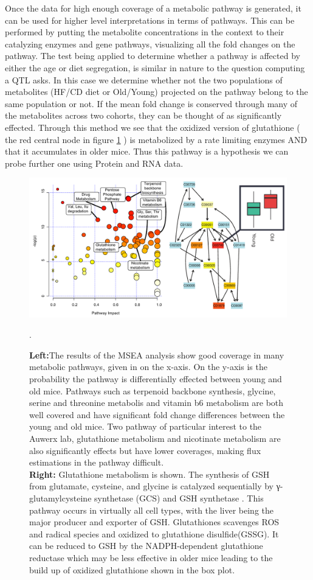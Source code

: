 \documentclass[a4paper]{book}
\begin{document}
	Once the data for high enough coverage of a metabolic pathway is generated, it can be used for higher level interpretations in terms of pathways. This can be performed by putting the metabolite concentrations in the context to their catalyzing enzymes and gene pathways, visualizing all the fold changes on the pathway. The test being applied to determine whether a pathway is affected by either the age or diet segregation, is similar in nature to the question computing a QTL asks. In this case we determine whether not the two populations of metabolites (HF/CD diet or Old/Young) projected on the pathway belong to the same population or not. If the mean fold change is conserved through many of the metabolites across two cohorts, they can be thought of as significantly effected\citep{Wishart2013}. Through this method we see that the oxidized version of glutathione ( the red central node in figure \ref{fig:MSEA} ) is metabolized by a rate limiting enzymes AND that it accumulates in older mice.  Thus this pathway is a hypothesis we can probe further one using Protein and RNA data.
	
	\begin{figure}
				\centering
		\includegraphics[width=0.99\linewidth]{3.Metabolomics/MSEA}
		\caption{\textbf{Left:}The results of the MSEA analysis show good coverage in many metabolic pathways, given in on the x-axis. On the y-axis is the probability the pathway is differentially effected between young and old mice. Pathways such as terpenoid backbone synthesis, glycine, serine and threonine metabolis and vitamin b6 metabolism are both well covered and have significant fold change differences between the young and old mice. Two pathway of particular interest to the Auwerx lab, glutathione metabolism and nicotinate metabolism are also significantly effects but have lower coverages, making flux estimations in the pathway difficult. \\ \textbf{Right:} Glutathione metabolism is shown. The synthesis of GSH from glutamate, cysteine, and glycine is catalyzed sequentially by γ-glutamylcysteine synthetase (GCS) and GSH synthetase . This pathway occurs in virtually all cell types, with the liver being the major producer and exporter of GSH. Glutathiones scavenges ROS and radical species and oxidized to glutathione disulfide(GSSG). It can be reduced to GSH by the NADPH-dependent glutathione reductase which may be less effective in older mice leading to the build up of oxidized glutathione shown in the box plot. \citep{Wu2004Glutathione}}. 
		\label{fig:MSEA}
	\end{figure}
	
\end{document}
